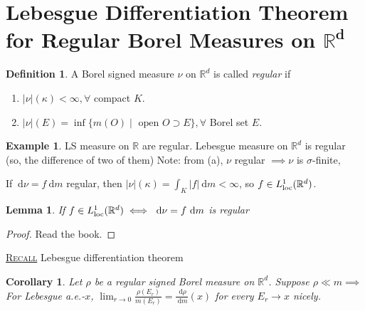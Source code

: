 \documentclass{report}
\newcommand{\R}{\mathbb{R}}
\newcommand{\df}{\ \mathrm{d}}
\newcommand{\fancyem}[1]{\underline{\textsc{#1}}}
\newtheorem{corollary}[theorem]{Corollary}
\newtheorem{lemma}[theorem]{Lemma}
\theoremstyle{definition}
\newtheorem{definition}[theorem]{Definition}
\newtheorem{example}[theorem]{Example}
\theoremstyle{remark}
\newcommand*\ttlmath[2]{\texorpdfstring{$\boldsymbol{#1}$}{#2}}
\begin{document}
\section{Lebesgue Differentiation Theorem for Regular Borel Measures on \ttlmath{\R^d}{R^d}}
\cite[p. 99]{follandRealAnalysisModern1999}
\begin{definition}
	A Borel signed measure $\nu$ on $\R^d$ is called \emph{regular} if \begin{enumerate}
		\item $|\nu|(\kappa) < \infty, \forall$ compact $K$.
		\item $|\nu|(E) = \inf\{ m(O) \mid \text{ open } O \supset E\}, \forall $ Borel set $E$.
	\end{enumerate}
\end{definition}
\begin{example}
	LS measure on $\R$ are regular. Lebesgue measure on $\R^d$ is regular (so, the difference of two of them) Note: from (a), $\nu$ regular $\implies \nu$ is $\sigma$-finite,

	If $\df \nu = f \df m$ regular, then $|\nu|(\kappa) = \int_K |f| \df m < \infty$, so $f \in L^1_\textup{loc}(\R^d)$.
\end{example}

\begin{lemma}
	If $f \in L^1_\textup{loc}(\R^d) \iff \df \nu = f \df m$ is regular
\end{lemma}
\begin{proof}
	Read the book.
\end{proof}

\fancyem{Recall} Lebesgue differentiation theorem

\begin{corollary}
	Let $\rho$ be a \emph{regular} signed Borel measure on $\R^d$. Suppose $\rho \ll m \implies$ For Lebesgue a.e.-$x$, $\lim_{r \to 0}\frac{\rho(E_r)}{m(E_r)} = \frac{\df \rho}{\df m}(x)$ for every $E_r \to x$ nicely. 
\end{corollary}
\end{document}
